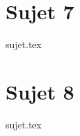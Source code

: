 \documentclass[a4paper, 10pt]{book}
\begin{document}
\resetQ
\newpage

\chapter{Sujet 7}

{sujet.tex}


\resetQ
\newpage

\chapter{Sujet 8}

{sujet.tex}
\end{document}
